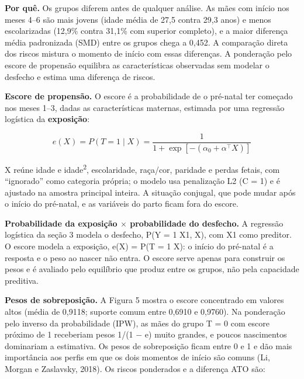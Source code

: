 \documentclass[10pt,a4paper]{article}
\newcommand{\menos}{\ensuremath{-}}
\newcommand{\vezes}{\ensuremath{\times}}
\newcommand{\secao}[2]{\par\needspace{6\baselineskip}\vspace{8pt}{\color{iptescuro}\bfseries\large{\color{iptazul}#1}~#2}\par
  \vspace{-2pt}{\color{iptgrade}\rule{\linewidth}{0.8pt}}\par\vspace{1pt}}
\begin{document}
\secao{4.}{Análise ATO: ponderação por sobreposição}

{\color{iptescuro}\bfseries Por quê.} Os grupos diferem antes de qualquer análise. As mães com início nos meses 4--6 são mais jovens (idade média de 27,5 contra 29,3 anos) e menos escolarizadas (12,9\% contra 31,1\% com superior completo), e a maior diferença média padronizada (SMD) entre os grupos chega a 0,452. A comparação direta dos riscos mistura o momento de início com essas diferenças. A ponderação pelo escore de propensão equilibra as características observadas sem modelar o desfecho e estima uma diferença de riscos.\par

{\color{iptescuro}\bfseries Escore de propensão.} O escore é a probabilidade de o pré-natal ter começado nos meses 1--3, dadas as características maternas, estimada por uma regressão logística da \textbf{exposição}:\par

\[e(X)=P(T=1\mid X)=\frac{1}{1+\exp\left[-\left(\alpha_0+\alpha^{\top}X\right)\right]}\]

X reúne idade e idade\textsuperscript{2}, escolaridade, raça/cor, paridade e perdas fetais, com ``ignorado'' como categoria própria; o modelo usa penalização L2 (C = 1) e é ajustado na amostra principal inteira. A situação conjugal, que pode mudar após o início do pré-natal, e as variáveis do parto ficam fora do escore.\par

\begin{caixa}{\color{iptescuro}\bfseries Probabilidade da exposição \vezes{} probabilidade do desfecho.} A regressão logística da seção 3 modela o desfecho, P(Y = 1 \textbar{} X1, X), com X1 como preditor. O escore modela a exposição, e(X) = P(T = 1 \textbar{} X): o início do pré-natal é a resposta e o peso ao nascer não entra. O escore serve apenas para construir os pesos e é avaliado pelo equilíbrio que produz entre os grupos, não pela capacidade preditiva.\end{caixa}

{\color{iptescuro}\bfseries Pesos de sobreposição.} A Figura 5 mostra o escore concentrado em valores altos (média de 0,9118; suporte comum entre 0,6910 e 0,9760). Na ponderação pelo inverso da probabilidade (IPW), as mães do grupo T = 0 com escore próximo de 1 receberiam pesos 1/(1 \menos{} e) muito grandes, e poucos nascimentos dominariam a estimativa. Os pesos de sobreposição ficam entre 0 e 1 e dão mais importância aos perfis em que os dois momentos de início são comuns (Li, Morgan e Zaslavsky, 2018). Os riscos ponderados e a diferença ATO são:\par
\end{document}
